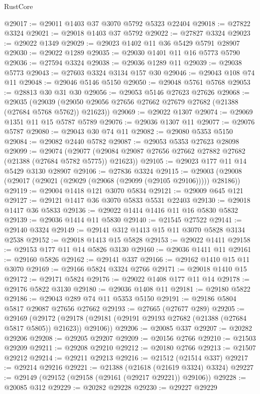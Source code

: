 \begin{lexlean}{RustCore}
\begin{coremodule}
@29017 := @29011 @1403 @37 @3070 @5792 @5323 @22404
@29018 := @27822 @3324
@29021 := @29018 @1403 @37 @5792
@29022 := @27827 @3324
@29023 := @29022 @1349
@29029 := @29023 @1402 @11 @36 @5429 @5791 @28907
@29030 := @29022 @1289
@29035 := @29030 @1401 @11 @16 @5773 @5790
@29036 := @27594 @3324
@29038 := @29036 @1289 @11
@29039 := @29038 @5773
@29043 := @27603 @3324 @3134 @157 @30
@29046 := @29043 @108 @74 @11
@29048 := @29046 @5146 @5150
@29050 := @29048 @5761 @5768
@29053 := @28813 @30 @31 @30
@29056 := @29053 @5146 @27623 @27626
@29068 := @29035
    (@29039 (@29050 @29056 @27656 @27662 @27679 @27682 (@21388 (@27684 @5768 @5762)) @21623))
@29069 := @29022 @1307
@29074 := @29069 @1351 @11 @15 @5787 @5789
@29076 := @29036 @1307 @11
@29077 := @29076 @5787
@29080 := @29043 @30 @74 @11
@29082 := @29080 @5353 @5150
@29084 := @29082 @2440 @5782
@29087 := @29053 @5353 @27623 @28098
@29099 := @29074
    (@29077 (@29084 @29087 @27656 @27662 @27882 @27682 (@21388 (@27684 @5782 @5775)) @21623))
@29105 := @29023 @177 @11 @14 @5429 @3130 @28907
@29106 := @27836 @3324
@29115 := @29003 (@29008 (@29017 (@29021 (@29029 (@29068 (@29099 (@29105 @29106))))) @28186))
@29119 := @29004 @1418 @121 @3070 @5834
@29121 := @29009 @645 @121
@29127 := @29121 @1417 @36 @3070 @5833 @5531 @22403
@29130 := @29018 @1417 @36 @5833
@29136 := @29022 @1414 @1416 @11 @16 @5830 @5832
@29139 := @29036 @1414 @11 @5830
@29140 := @21545 @27522
@29141 := @29140 @3324
@29149 := @29141 @312 @1413 @15 @11 @3070 @5828 @3134 @2538
@29152 := @29018 @1413 @15 @5828
@29153 := @29022 @1411
@29158 := @29153 @177 @11 @14 @5826 @3130
@29160 := @29036 @1411 @11
@29161 := @29160 @5826
@29162 := @29141 @337
@29166 := @29162 @1410 @15 @11 @3070
@29169 := @29166 @5824 @3324 @2766
@29171 := @29018 @1410 @15
@29172 := @29171 @5824
@29176 := @29022 @1408 @177 @11 @14
@29178 := @29176 @5822 @3130
@29180 := @29036 @1408 @11
@29181 := @29180 @5822
@29186 := @29043 @289 @74 @11 @5353 @5150
@29191 := @29186 @5804 @5817 @29087 @27656 @27662
@29193 := @27665 (@27677 @289)
@29205 := @29169
    (@29172 (@29178 (@29181 (@29191 @29193 @27682 (@21388 (@27684 @5817 @5805)) @21623)) @29106))
@29206 := @20085 @337
@29207 := @20282 @29206
@29208 := @29205 @29207
@29209 := @20156 @2766
@29210 := @21503 @29209
@29211 := @29208 @29210
@29212 := @20180 @2766
@29213 := @21507 @29212
@29214 := @29211 @29213
@29216 := @21512 (@21514 @337)
@29217 := @29214 @29216
@29221 := @21388 (@21618 (@21619 @3324) @3324)
@29227 := @29149 (@29152 (@29158 (@29161 (@29217 @29221)) @29106))
@29228 := @20085 @312
@29229 := @20282 @29228
@29230 := @29227 @29229

\end{coremodule}
\end{lexlean}
